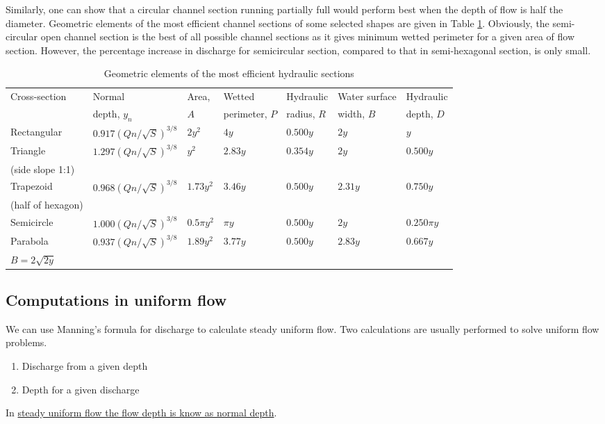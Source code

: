 \documentclass[a4paper, 12pt, british]{article} %
\numberwithin{equation}{section}
\numberwithin{figure}{section}
\numberwithin{table}{section}
\begin{document}
Similarly, one can show that a circular channel section
running partially full would perform best when the depth of
flow is half the diameter. Geometric elements of the most
efficient channel sections of some selected shapes are given
in Table \ref{tab:1281}. Obviously, the semi-circular open channel
section is the best of all possible channel sections as it
gives minimum wetted perimeter for a given area of flow
section. However, the percentage increase in discharge for
semicircular section, compared to that in semi-hexagonal
section, is only small.

\begin{table}[H]
	\centering
	\begin{tabular}{ l llllll }
		\hline
		Cross-section & Normal & Area,  & Wetted  & Hydraulic  & Water surface  & Hydraulic \\
		& depth, $y_n$ & $A$ & perimeter, $P$ & radius, $R$ &  width, $B$ & depth, $D$\\
		\hline 
		Rectangular & $0.917 (Qn/\sqrt{S})^{3/8}$ & $2y^2$ & $4y$ & $0.500 y$ & $2y$ & $y$\\
		Triangle & $1.297 (Qn/\sqrt{S})^{3/8}$ & $y^2$ & $2.83 y$ & $0.354 y$ & $2y$ & $0.500y$\\
		(side slope 1:1) &  &  &  &  &   & \\
		Trapezoid  & $0.968 (Qn/\sqrt{S})^{3/8}$ & $1.73 y^2$ & $3.46 y$ & $0.500 y$ & $2.31 y$ & $0.750 y$\\
		(half of hexagon)  &  &  &  &  &   & \\
		Semicircle & $1.000 (Qn/\sqrt{S})^{3/8}$ &  $0.5\pi y^2$ & $\pi y$ & $0.500y$ & $2y$ & $0.250 \pi y$ \\
		Parabola  & $0.937 (Qn/\sqrt{S})^{3/8}$ & $1.89 y^2$ & $3.77 y$ & $0.500 y$ & $2.83 y$ & $0.667 y$\\
		$B  =  2\sqrt{2y}$ &  &  &  &  &  &   \\
		\hline
	\end{tabular}
	\caption{Geometric elements of the most efficient
		hydraulic sections \cite{french94}}
	\label{tab:1281}
\end{table}

\subsection{Computations in uniform flow}

We can use Manning's formula for discharge to calculate steady uniform flow. Two calculations are usually performed to solve uniform flow problems.
\begin{enumerate}
	\item Discharge from a given depth
	\item Depth for a given discharge
\end{enumerate}
In \underline{steady uniform flow the flow depth is know as normal depth}.
\end{document}
